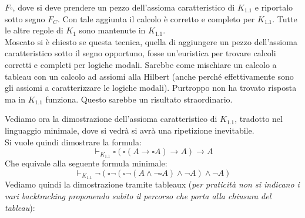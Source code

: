 \documentclass[a4paper,12pt, oneside]{book}
\begin{document}
$F\square$, dove si deve prendere un pezzo dell'assioma caratteristico di
$K_{1.1}$ e riportalo sotto segno $F_C$. Con tale aggiunta il calcolo è
corretto e completo per $K_{1.1}$. Tutte le altre regole di $K_1$ sono mantenute
in $K_{1.1}$.\\
Moscato si è chiesto se questa tecnica, quella di aggiungere un pezzo
dell'assioma caratteristico sotto il segno opportuno, fosse un'euristica per
trovare calcoli corretti e completi per logiche modali. Sarebbe come mischiare
un calcolo a tableau con un calcolo ad assiomi alla Hilbert (anche perché
effettivamente sono gli assiomi a caratterizzare le logiche modali). Purtroppo
non ha trovato risposta ma in $K_{1.1}$ funziona. Questo sarebbe un risultato
straordinario.
\begin{esempio}
  Vediamo ora la dimostrazione dell'assioma caratteristico di
  $K_{1.1}$, tradotto nel linguaggio minimale, dove si vedrà si avrà una
  ripetizione inevitabile.\\
  Si vuole quindi dimostrare la formula:
  \[\vdash_{K_{1.1}}\square(\square(A\to \square A)\to A)\to A\]
  Che equivale alla seguente formula minimale:
  \[\vdash_{K_{1.1}}\neg(\square\neg(\square\neg(A\land\neg\square A)\land \neg
    A)\land \neg A)\] 
  Vediamo quindi la dimostrazione tramite tableaux (\textit{per praticità non
    si indicano i vari backtracking proponendo subito il percorso che porta alla
    chiusura del tableau}):
  

\end{esempio}
\end{document}
